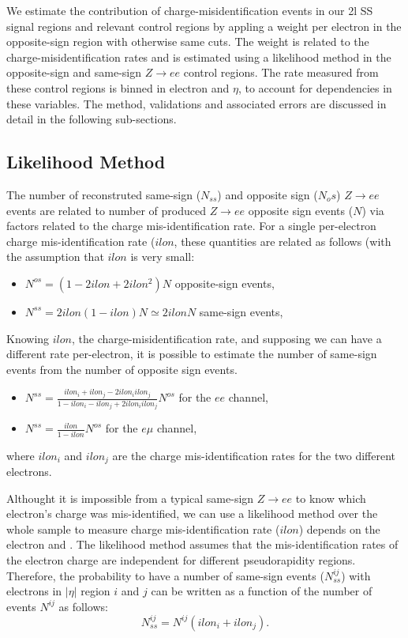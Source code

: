 We estimate the contribution of charge-misidentification events in our 2l SS signal regions and relevant control regions by appling a weight per electron in the opposite-sign region with otherwise same cuts. The weight is related to the charge-misidentification rates and is estimated using a likelihood method in the opposite-sign and same-sign $Z\rightarrow ee$ control regions. The rate measured from these control regions is binned in electron \pt and $\eta$, to account for dependencies in these variables. The method, validations and associated errors are discussed in detail in the following sub-sections.


\subsection{Likelihood Method}

The number of reconstruted same-sign ($N_{ss}$) and opposite sign ($N_os$) $Z\rightarrow ee$ events are related to number of produced $Z\rightarrow ee$ opposite sign events ($N$) via factors related to the charge mis-identification rate. For a single per-electron charge mis-identification rate ($ilon$, these quantities are related as follows (with the assumption that $ilon$ is very small: 

\begin{itemize}
\item $N^{os} = (1-2ilon+2ilon^2) N$ opposite-sign events,
\item $N^{ss} = 2ilon(1-ilon) N \simeq 2ilon N$ same-sign events,
\end{itemize}


Knowing $ilon$, the charge-misidentification rate, and supposing we can have a different rate per-electron, it is possible to estimate the number of same-sign events from the number of opposite sign events.

\begin{itemize}
\item $N^{ss} = \frac{ilon_i +ilon_j -2ilon_i ilon_j}{1-ilon_i -ilon_j +2ilon_i ilon_j} N^{os}$ for the $ee$ channel,
\item $N^{ss} = \frac{ilon}{1-ilon} N^{os}$ for the $e\mu$ channel,
\end{itemize}
where $ilon_i$ and $ilon_j$ are the charge mis-identification rates for the two
different electrons.


Althought it is impossible from a typical same-sign $Z\rightarrow ee$ to know which electron's charge was mis-identified, we can use a likelihood method over the whole sample to measure charge mis-identification rate ($ilon$) depends on the electron \pt and \eta.  The likelihood method assumes that  the mis-identification rates of the electron charge are independent for different pseudorapidity regions. Therefore, the probability to have a number of same-sign events ($N^{ij}_{ss}$) with electrons in $|\eta|$ region $i$ and $j$ can be written as a function of the number of events $N^{ij}$ as follows:
\begin{equation}
N^{ij}_{ss}=N^{ij}(ilon_i+ilon_j).
\end{equation}



